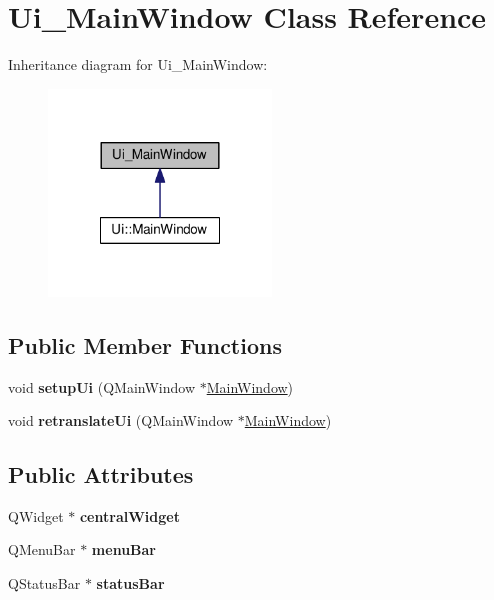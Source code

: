 \hypertarget{classUi__MainWindow}{\section{Ui\-\_\-\-Main\-Window Class Reference}
\label{classUi__MainWindow}
}


Inheritance diagram for Ui\-\_\-\-Main\-Window\-:
\nopagebreak
\begin{figure}[H]
\begin{center}
\leavevmode
\includegraphics[width=168pt]{classUi__MainWindow__inherit__graph}
\end{center}
\end{figure}
\subsection*{Public Member Functions}
\begin{DoxyCompactItemize}
\item 
\hypertarget{classUi__MainWindow_acf4a0872c4c77d8f43a2ec66ed849b58}{void {\bfseries setup\-Ui} (Q\-Main\-Window $\ast$\hyperlink{classMainWindow}{Main\-Window})}\label{classUi__MainWindow_acf4a0872c4c77d8f43a2ec66ed849b58}

\item 
\hypertarget{classUi__MainWindow_a097dd160c3534a204904cb374412c618}{void {\bfseries retranslate\-Ui} (Q\-Main\-Window $\ast$\hyperlink{classMainWindow}{Main\-Window})}\label{classUi__MainWindow_a097dd160c3534a204904cb374412c618}

\end{DoxyCompactItemize}
\subsection*{Public Attributes}
\begin{DoxyCompactItemize}
\item 
\hypertarget{classUi__MainWindow_a30075506c2116c3ed4ff25e07ae75f81}{Q\-Widget $\ast$ {\bfseries central\-Widget}}\label{classUi__MainWindow_a30075506c2116c3ed4ff25e07ae75f81}

\item 
\hypertarget{classUi__MainWindow_a2be1c24ec9adfca18e1dcc951931457f}{Q\-Menu\-Bar $\ast$ {\bfseries menu\-Bar}}\label{classUi__MainWindow_a2be1c24ec9adfca18e1dcc951931457f}

\item 
\hypertarget{classUi__MainWindow_a50fa481337604bcc8bf68de18ab16ecd}{Q\-Status\-Bar $\ast$ {\bfseries status\-Bar}}\label{classUi__MainWindow_a50fa481337604bcc8bf68de18ab16ecd}

\end{DoxyCompactItemize}


